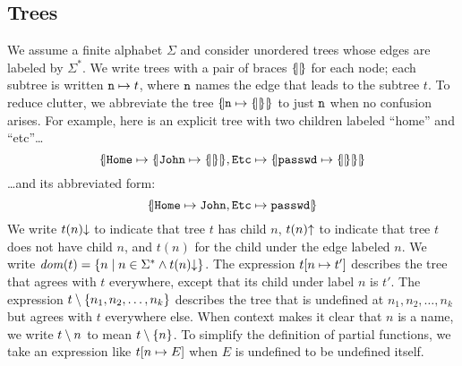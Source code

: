 \subsection{Trees}
We assume a finite alphabet $\Sigma$ and consider unordered trees whose
edges are labeled by $\Sigma^*$. We write trees with a pair of
braces $\{\hspace{-2pt}||\hspace{-2pt}\}$ for each node; each subtree is written
$\mathtt{n}\mapsto t$, where $\mathtt{n}$ names the edge that leads to the subtree
$t$. To reduce clutter, we abbreviate the tree
$\{\hspace{-2pt}|\mathtt{n}\mapsto\{\hspace{-2pt}||\hspace{-2pt}\}|\hspace{-2pt}\}$ to just $\mathtt{n}$ when no confusion
arises. For example, here is an explicit tree with two children labeled
``home'' and ``etc''\dots
\[\{\hspace{-2pt}|\mathtt{Home}\mapsto\{\hspace{-2pt}|\mathtt{John}\mapsto\{\hspace{-2pt}||\hspace{-2pt}\}|\hspace{-2pt}\},\mathtt{Etc}\mapsto\{\hspace{-2pt}|\mathtt{passwd}\mapsto\{\hspace{-2pt}||\hspace{-2pt}\}|\hspace{-2pt}\}|\hspace{-2pt}\}\]
\dots{}and its abbreviated form:
\[\{\hspace{-2pt}|\mathtt{Home}\mapsto\mathtt{John},\mathtt{Etc}\mapsto\mathtt{passwd}|\hspace{-2pt}\}\]
We write $t(n){\downarrow}$ to indicate that tree $t$ has child $n$,
$t(n){\uparrow}$ to indicate that tree $t$ does not have child $n$, and
$t(n)$ for the child under the edge labeled $n$. We write $\mathit{dom}(t)=\{n \mid
n \in \Sigma^* \land t(n){\downarrow}\}$. The expression $t[n \mapsto t']$ describes the
tree that agrees with $t$ everywhere, except that its child under label $n$
is $t'$.  The expression $t \setminus \{n_1,n_2,\ldots,n_k\}$ describes the
tree that is
undefined at $n_1,n_2,\ldots,n_k$ but agrees with $t$ everywhere else. When
context makes it clear that $n$ is a name, we write $t \setminus
n$ to mean $t \setminus \{n\}$. To simplify the definition of partial
functions, we take an expression like
$t[n \mapsto E]$ when $E$ is undefined to be undefined itself.

